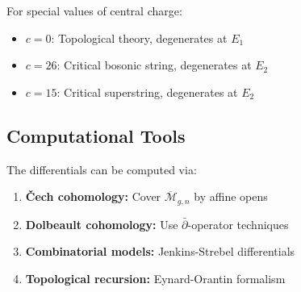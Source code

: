 \begin{theorem}[Degeneration at $E_2$]
For special values of central charge:
\begin{itemize}
\item $c = 0$: Topological theory, degenerates at $E_1$
\item $c = 26$: Critical bosonic string, degenerates at $E_2$  
\item $c = 15$: Critical superstring, degenerates at $E_2$
\end{itemize}
\end{theorem}

\subsection{Computational Tools}

The differentials can be computed via:
\begin{enumerate}
\item \textbf{Čech cohomology:} Cover $\overline{\mathcal{M}}_{g,n}$ by affine opens
\item \textbf{Dolbeault cohomology:} Use $\bar{\partial}$-operator techniques
\item \textbf{Combinatorial models:} Jenkins-Strebel differentials
\item \textbf{Topological recursion:} Eynard-Orantin formalism
\end{enumerate}
